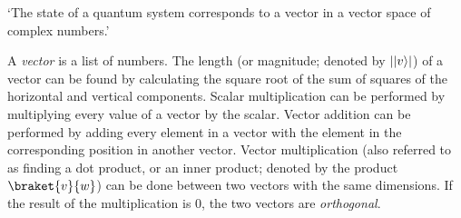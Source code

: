 
`The state of a quantum system corresponds to a vector in a vector space of complex numbers.'

\begin{definition}
  A \emph{vector} is a list of numbers.
  The length (or magnitude; denoted by $\lvert\lvert v\rangle\rvert$) of a vector can be found by calculating the square root of the sum of squares of the horizontal and vertical components.
  Scalar multiplication can be performed by multiplying every value of a vector by the scalar.
  Vector addition can be performed by adding every element in a vector with the element in the corresponding position in another vector.
  Vector multiplication (also referred to as finding a dot product, or an inner product; denoted by the product $\braket{v}{w}$) can be done between two vectors with the same dimensions. If the result of the multiplication is $0$, the two vectors are \emph{orthogonal}.
\end{definition}

